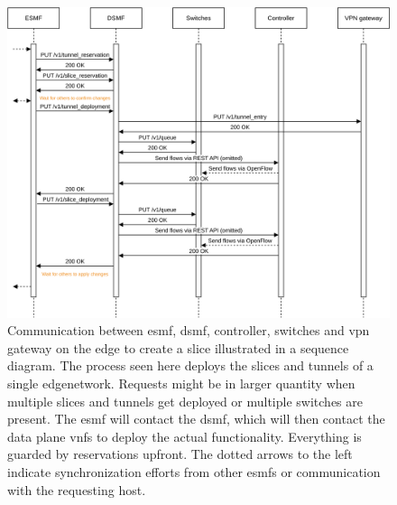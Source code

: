 \begin{figure}[H]
    \centering
    \includegraphics[width=\linewidth]{images/chapter_6/slice_creation_edge.png}
    \caption[Slice creation on an \gls{edgenetwork}]{Communication between \acrshort{esmf}, \acrshort{dsmf}, controller, switches and \acrshort{vpn} gateway on the edge to create a slice illustrated in a sequence diagram. The process seen here deploys the slices and tunnels of a single \gls{edgenetwork}. Requests might be in larger quantity when multiple slices and tunnels get deployed or multiple switches are present. The \acrshort{esmf} will contact the \acrshort{dsmf}, which will then contact the data plane \acrshort{vnf}s to deploy the actual functionality. Everything is guarded by reservations upfront. The dotted arrows to the left indicate synchronization efforts from other \acrshort{esmf}s or communication with the requesting host.}
    \label{fig:slice_creation_edge}
\end{figure}

